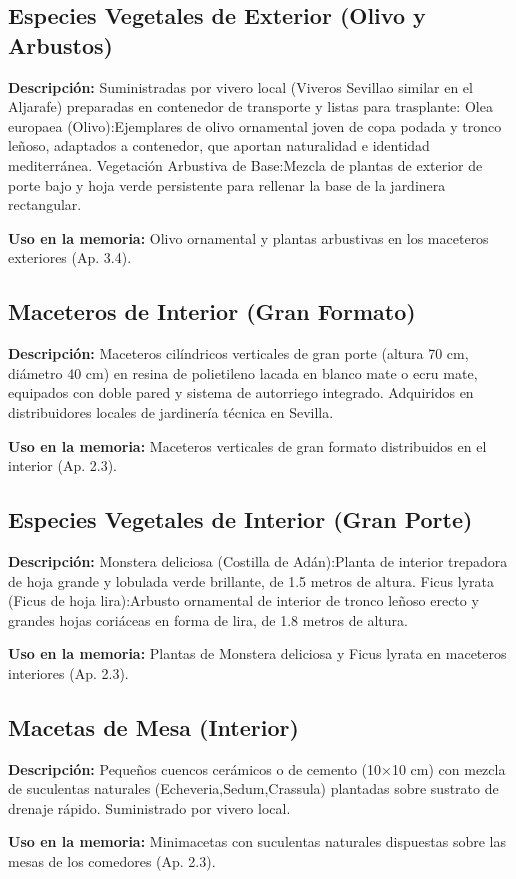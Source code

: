 \subsection{Especies Vegetales de Exterior (Olivo y Arbustos)}
\label{veg:ext}
\textbf{Descripción:} Suministradas por vivero local (Viveros Sevillao similar en el Aljarafe) preparadas en contenedor de transporte y listas para trasplante: Olea europaea (Olivo):Ejemplares de olivo ornamental joven de copa podada y tronco leñoso, adaptados a contenedor, que aportan naturalidad e identidad mediterránea. Vegetación Arbustiva de Base:Mezcla de plantas de exterior de porte bajo y hoja verde persistente para rellenar la base de la jardinera rectangular.

\textbf{Uso en la memoria:} Olivo ornamental y plantas arbustivas en los maceteros exteriores (Ap. 3.4).


\subsection{Maceteros de Interior (Gran Formato)}
\label{veg:maceta_int}
\textbf{Descripción:} Maceteros cilíndricos verticales de gran porte (altura 70 cm, diámetro 40 cm) en resina de polietileno lacada en blanco mate o ecru mate, equipados con doble pared y sistema de autorriego integrado. Adquiridos en distribuidores locales de jardinería técnica en Sevilla.

\textbf{Uso en la memoria:} Maceteros verticales de gran formato distribuidos en el interior (Ap. 2.3).


\subsection{Especies Vegetales de Interior (Gran Porte)}
\label{veg:int}
\textbf{Descripción:} Monstera deliciosa (Costilla de Adán):Planta de interior trepadora de hoja grande y lobulada verde brillante, de 1.5 metros de altura. Ficus lyrata (Ficus de hoja lira):Arbusto ornamental de interior de tronco leñoso erecto y grandes hojas coriáceas en forma de lira, de 1.8 metros de altura.

\textbf{Uso en la memoria:} Plantas de Monstera deliciosa y Ficus lyrata en maceteros interiores (Ap. 2.3).


\subsection{Macetas de Mesa (Interior)}
\label{veg:maceta_mesa}
\textbf{Descripción:} Pequeños cuencos cerámicos o de cemento (10×10 cm) con mezcla de suculentas naturales (Echeveria,Sedum,Crassula) plantadas sobre sustrato de drenaje rápido. Suministrado por vivero local.

\textbf{Uso en la memoria:} Minimacetas con suculentas naturales dispuestas sobre las mesas de los comedores (Ap. 2.3).

